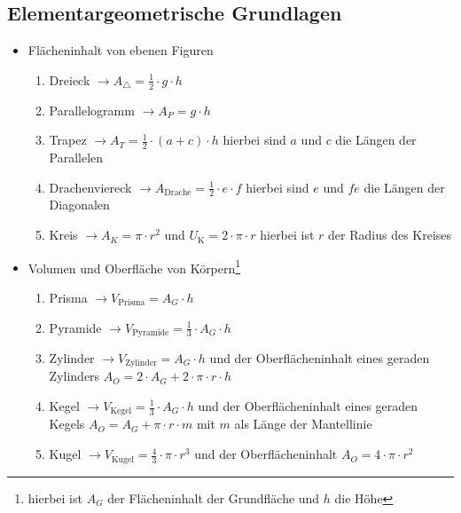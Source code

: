 \documentclass[a4paper,twocolumn,10pt]{onepgnote1}
\begin{document}
\subsection{Elementargeometrische Grundlagen}
\begin{itemize}
\item Flächeninhalt von ebenen Figuren\\
\begin{enumerate}
\item Dreieck $\longrightarrow A_{\triangle} = \frac{1}{2} \cdot g\cdot h$\\
\item Parallelogramm $\longrightarrow A_{P} = g\cdot h$\\
\item Trapez $\longrightarrow A_{T} = \frac{1}{2} \cdot (a+c)\cdot h$ hierbei sind $a$ und $c$ die Längen der Parallelen \\
\item Drachenviereck $\longrightarrow A_{\text{Drache}} = \frac{1}{2} \cdot e\cdot f$ hierbei sind $e$ und $fe$ die Längen der Diagonalen \\
\item  Kreis  $\longrightarrow A_{K} = \pi \cdot r^2$ und $U_{\text{K}} = 2\cdot \pi \cdot r$ hierbei ist $r$ der Radius des Kreises
\end{enumerate}
\item Volumen und Oberfläche von Körpern\footnote{hierbei ist $A_G$ der Flächeninhalt der Grundfläche und $h$ die Höhe}\\
\begin{enumerate}
\item Prisma $\longrightarrow V_{\text{Prisma}} = A_G \cdot h$  \\
\item Pyramide $\longrightarrow V_{\text{Pyramide}} = \frac{1}{3}\cdot A_G \cdot h$ \\
\item Zylinder $\longrightarrow V_{\text{Zylinder}} = A_G \cdot h$ und der Oberflächeninhalt eines geraden Zylinders $A_O = 2\cdot A_G + 2\cdot \pi\cdot r \cdot h$\\
\item Kegel $\longrightarrow V_{\text{Kegel}} = \frac{1}{3} \cdot A_G \cdot h$ und der Oberflächeninhalt eines geraden Kegels $A_O = A_G +  \pi\cdot r \cdot m$ mit $m $ als Länge der Mantellinie\\
\item Kugel $\longrightarrow V_{\text{Kugel}} = \frac{4}{3} \cdot \pi \cdot r^3$ und der Oberflächeninhalt $A_O = 4\cdot \pi \cdot r^2$
\end{enumerate}
\end{itemize}
\end{document}
